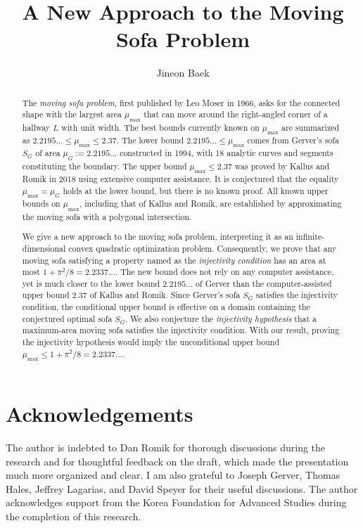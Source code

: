 \documentclass[10pt]{article}
\title{A New Approach to the Moving Sofa Problem}
\author{Jineon Baek}
\theoremstyle{plain}
\theoremstyle{definition}
\theoremstyle{remark}
\begin{document}
\maketitle

\begin{abstract}
    The \emph{moving sofa problem}, first published by Leo Moser in 1966, asks for the connected shape with the largest area $\mu_{\text{max}}$ that can move around the right-angled corner of a hallway $L$ with unit width. The best bounds currently known on $\mu_{\max}$ are summarized as $2.2195\ldots \leq \mu_{\max} \leq 2.37$. The lower bound $2.2195\ldots \leq \mu_{\max}$ comes from Gerver's sofa $S_G$ of area $\mu_G := 2.2195\ldots$ constructed in 1994, with 18 analytic curves and segments constituting the boundary. The upper bound $\mu_{\max} \leq 2.37$ was proved by Kallus and Romik in 2018 using extensive computer assistance. It is conjectured that the equality $\mu_{\max} = \mu_G$ holds at the lower bound, but there is no known proof. All known upper bounds on $\mu_{\max}$, including that of Kallus and Romik, are established by approximating the moving sofa with a polygonal intersection.

    We give a new approach to the moving sofa problem, interpreting it as an infinite-dimensional convex quadratic optimization problem. Consequently, we prove that any moving sofa satisfying a property named as the \emph{injectivity condition} has an area at most $1 + \pi^2/8 = 2.2337\dots$. The new bound does not rely on any computer assistance, yet is much closer to the lower bound $2.2195\ldots$ of Gerver than the computer-assisted upper bound $2.37$ of Kallus and Romik. Since Gerver's sofa $S_G$ satisfies the injectivity condition, the conditional upper bound is effective on a domain containing the conjectured optimal sofa $S_G$. We also conjecture the \emph{injectivity hypothesis} that a maximum-area moving sofa satisfies the injectivity condition. With our result, proving the injectivity hypothesis would imply the unconditional upper bound $\mu_{\max} \leq 1 + \pi^2/8 = 2.2337\ldots$.
\end{abstract}

\tableofcontents



\section*{Acknowledgements}

The author is indebted to Dan Romik for thorough discussions during the research and for thoughtful feedback on the draft, which made the presentation much more organized and clear. I am also grateful to Joseph Gerver, Thomas Hales, Jeffrey Lagarias, and David Speyer for their useful discussions. The author acknowledges support from the Korea Foundation for Advanced Studies during the completion of this research.

\printbibliography
\end{document}
